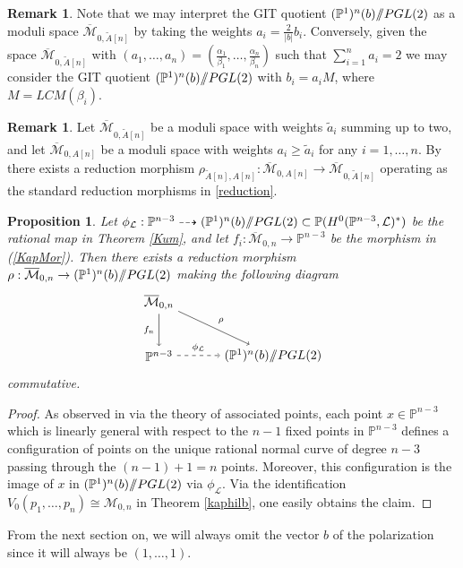 \documentclass[a4paper,10pt]{amsart}
\newtheorem{Proposition}[thm]{Proposition}
\theoremstyle{definition}
\newtheorem{Remark}[thm]{Remark}
\newcommand{\cM}{\overline{\mathcal{M}}}
\newcommand{\quot}{/\hspace{-1.2mm}/}
\begin{document}
\begin{Remark}\label{GITHas}
Note that we may interpret the GIT quotient $(\mathbb{P}^1)^n(b)\quot PGL(2)$ as a moduli space $\cM_{0,\widetilde{A}[n]}$ by taking the weights $a_i = \frac{2}{|b|}b_i$. Conversely, given the space $\cM_{0,\widetilde{A}[n]}$ with $(a_1,\dots,a_n) = (\frac{\alpha_1}{\beta_1},\dots,\frac{\alpha_n}{\beta_n})$ such that $\sum_{i=1}^na_i=2$ we may consider the GIT quotient $(\mathbb{P}^1)^n(b)\quot PGL(2)$ with $b_i = a_iM$, where $M= LCM(\beta_i)$.
\end{Remark}

\begin{Remark}\label{redwst}
Let $\cM_{0,\widetilde{A}[n]}$ be a moduli space with weights $\widetilde{a}_i$ summing up to two, and let $\cM_{0,A[n]}$ be a moduli  space with weights $a_i\geq \widetilde{a}_i$ for any $i=1,\dots,n$. By \cite[Theorem 8.3]{Ha} there exists a reduction morphism $\rho_{\widetilde{A}[n],A[n]}:\cM_{0,A[n]}\rightarrow\cM_{0,\widetilde{A}[n]}$ operating as the standard reduction morphisms in \ref{reduction}.
\end{Remark}

\begin{Proposition}\label{res}
Let $\phi_{\mathcal{L}}:\mathbb{P}^{n-3}\dasharrow (\mathbb{P}^1)^n(b)\quot PGL(2)\subset\mathbb{P}(H^0(\mathbb{P}^{n-3},\mathcal{L})^{*})$ be the rational map in Theorem \ref{Kum}, and let $f_i:\cM_{0,n}\rightarrow\mathbb{P}^{n-3}$ be the morphism in (\ref{KapMor}). Then there exists a reduction morphism $\rho:\cM_{0,n}\rightarrow (\mathbb{P}^1)^n(b)\quot PGL(2)$ making the following diagram 
 \[
  \begin{tikzpicture}[xscale=3.2,yscale=-1.5]
    \node (A0_0) at (0, 0) {$\cM_{0,n}$};
    \node (A1_0) at (0, 1) {$\mathbb{P}^{n-3}$};
    \node (A1_1) at (1, 1) {$(\mathbb{P}^1)^n(b)\quot PGL(2)$};
    \path (A0_0) edge [->,swap]node [auto] {$\scriptstyle{f_n}$} (A1_0);
    \path (A1_0) edge [->,dashed]node [auto] {$\scriptstyle{\phi_{\mathcal{L}}}$} (A1_1);
    \path (A0_0) edge [->]node [auto] {$\scriptstyle{\rho}$} (A1_1);
  \end{tikzpicture}
  \]
commutative.  
\end{Proposition}

\begin{proof}
As observed in \cite{Ku03} via the theory of associated points, each point $x\in \mathbb{P}^{n-3}$ which is linearly general with respect to the $n-1$ fixed points in $\mathbb{P}^{n-3}$ defines a configuration of points on the unique rational normal curve of degree $n-3$ passing through the $(n-1)+1=n$ points. Moreover, this configuration is the image of $x$ in $(\mathbb{P}^1)^n(b)\quot PGL(2)$ via $\phi_{\mathcal{L}}$. Via the identification $V_0(p_1,\dots,p_n)\cong \mathcal{M}_{0,n}$ in Theorem \ref{kaphilb}, one easily obtains the claim.
\end{proof}
From the next section on, we will always omit the vector $b$ of the polarization since it will always be $(1, \dots, 1)$.
\end{document}
